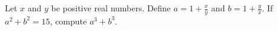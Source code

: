 Let $x$ and $y$ be positive real numbers. Define $a = 1 + \tfrac{x}{y}$ and $b = 1 + \tfrac{y}{x}$. If $a^2 + b^2 = 15$, compute $a^3 + b^3$.